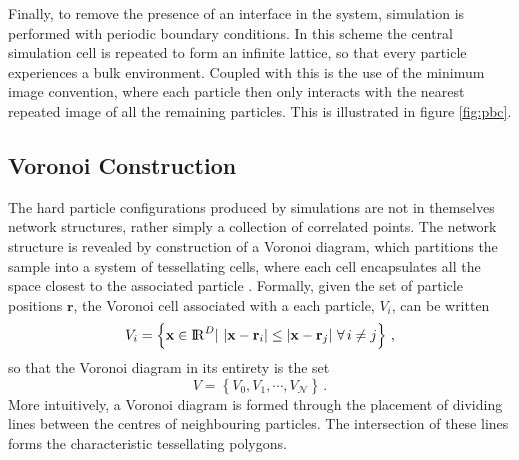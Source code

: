 Finally, to remove the presence of an interface in the system, simulation is performed with periodic boundary conditions.
In this scheme the central simulation cell is repeated to form an infinite lattice, so that every particle experiences a bulk environment.
Coupled with this is the use of the minimum image convention, where each particle then only interacts with the nearest repeated image of all the remaining particles.
This is illustrated in figure \ref{fig:pbc}.
 
\subsection{Voronoi Construction}
\label{s:voronoiintro}

The hard particle configurations produced by \mc{} simulations are not in themselves network structures, rather simply a collection of correlated points.
The network structure is revealed by construction of a Voronoi diagram, which partitions the sample into a system of tessellating cells, where each cell encapsulates all the space closest to the associated particle \cite{Okabe1992}.
Formally, given the set of particle positions $\mathbf{r}$, the Voronoi cell associated with a each particle, $V_i$, can be written
\begin{equation}
	V_i = \left\{\mathbf{x}\in {\rm I\!R}^D | \,\, \lvert\mathbf{x}-\mathbf{r}_{i}\rvert\leq \lvert\mathbf{x}-\mathbf{r}_{j}\rvert \,\, \forall \, i\neq j\right\}\,,
\end{equation}
so that the Voronoi diagram in its entirety is the set
\begin{equation}
	V = \left\{V_0, V_1, \cdots, V_\mathcal{N}\right\}\,.
\end{equation} 
More intuitively, a Voronoi diagram is formed through the placement of dividing lines between the centres of neighbouring particles. 
The intersection of these lines forms the characteristic tessellating polygons.


